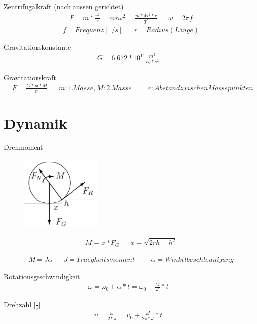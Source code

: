 \documentclass[17pt]{extarticle}
\begin{document}
	Zentrifugalkraft (nach aussen gerichtet)
	\begin{align}
		&F = m * \frac{v^2}{r} = m r \omega^2 = \frac{m * 4 \pi^2 * r}{T^2}
		&&\omega = 2 \pi f
	\end{align}
	\begin{align}
		& f = Frequenz [1/s]
		&& r = Radius (Länge)
	\end{align}
	
	Gravitationskonstante
	\begin{align}
		G = 6.672 * 10^{11} \frac{m^3}{kg*s^2}
	\end{align}
	
	Gravitationskraft
	\begin{align}
		&F = \frac{G * m * M}{r^2}
		&&m: 1. Masse, M: 2. Masse
		&&&r: Abstand zwischen Massepunkten
	\end{align}
	
\section{Dynamik}
	Drehmoment
	
	\begin{figure}[h!]
		\centering
		\includegraphics[width=4cm]{img/Drehmoment.png}
	\end{figure}


	\begin{align}
		&M = x*F_{G}
		&&x = \sqrt{2rh - h^2}
	\end{align}
	
	\begin{align}
		&M = J \alpha
		&&J = Traegheitsmoment
		&&&\alpha = Winkelbeschleunigung
	\end{align}
	
	Rotationsgeschwindigkeit
	\begin{align}
		\omega = \omega_{0} + \alpha * t = \omega_{0} + \frac{M}{J} * t
	\end{align}
	
	Drehzahl [$\frac{1}{s}$]
	\begin{align}
		\upsilon = \frac{\omega}{2 * \pi} = \upsilon_{0} + \frac{M}{2\pi * J} * t 
	\end{align}
	
\end{document}
